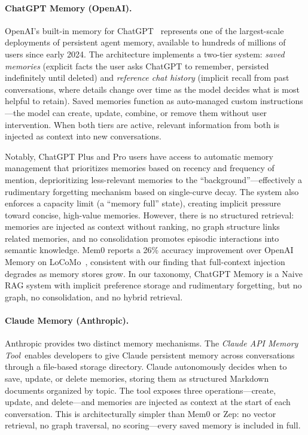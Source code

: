 \paragraph{ChatGPT Memory (OpenAI).}
OpenAI's built-in memory for ChatGPT~\cite{openai2024memoryfaq}\evD
represents one of the largest-scale deployments of persistent agent memory,
available to hundreds of millions of users since early 2024. The
architecture implements a two-tier system\evD: \emph{saved memories}
(explicit facts the user asks ChatGPT to remember, persisted
indefinitely until deleted) and \emph{reference chat history} (implicit
recall from past conversations, where details change over time as the
model decides what is most helpful to retain). Saved memories function
as auto-managed custom instructions---the model can create, update,
combine, or remove them without user intervention. When both tiers are
active, relevant information from both is injected as context into new
conversations.

Notably, ChatGPT Plus and Pro users have access to automatic memory
management that prioritizes memories based on recency and frequency of
mention\evV, deprioritizing less-relevant memories to the
``background''---effectively a rudimentary forgetting mechanism based on
single-curve decay\evI. The system also enforces a capacity limit (a
``memory full'' state)\evV, creating implicit pressure toward concise,
high-value memories. However, there is no structured retrieval\evI:
memories are injected as context without ranking, no graph structure
links related memories, and no consolidation promotes episodic
interactions into semantic knowledge. Mem0 reports a 26\% accuracy
improvement over OpenAI Memory on LoCoMo~\cite{choudhary2025mem0},
consistent with our finding that full-context injection degrades as
memory stores grow. In our taxonomy, ChatGPT Memory is a Naive RAG
system with implicit preference storage and rudimentary forgetting, but
no graph, no consolidation, and no hybrid retrieval.

\paragraph{Claude Memory (Anthropic).}
Anthropic provides two distinct memory mechanisms. The \emph{Claude API
Memory Tool}~\cite{anthropic2026memorytool}\evD enables developers to give
Claude persistent memory across conversations through a file-based
storage directory. Claude autonomously decides when to save, update, or
delete memories, storing them as structured Markdown documents organized
by topic. The tool exposes three operations---create, update, and
delete\evD---and memories are injected as context at the start of each
conversation. This is architecturally simpler than Mem0 or Zep: no
vector retrieval, no graph traversal, no scoring---every saved memory
is included in full\evD.

